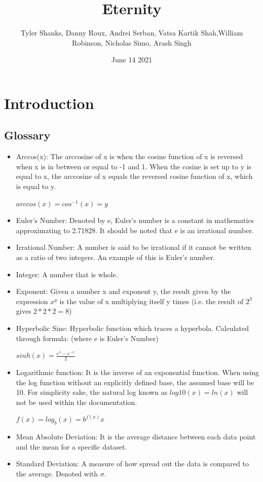 \documentclass[titlepage]{article}
\title{Eternity}
\author{Tyler Shanks, Danny Roux, Andrei Serban, Vatsa Kartik Shah,\newpage William Robinson, Nicholas Simo, Arash Singh}
\date{June 14 2021}
\begin{document}



\fancyfoot{\thepage}

\tableofcontents
\newpage

\section{Introduction}
    \subsection{Glossary}
        \begin{itemize}
            \item Arccos(x): The arccosine of x is when the cosine function of x is reversed when x is in between or equal to -1 and 1. When the cosine is set up to y is equal to x, the arccosine of x equals the reversed cosine function of x, which is equal to y. \cite{arccos}
            \begin{center}
                $arccos(x) = cos^{-1}(x) = y$
            \end{center}
            \item Euler’s Number: Denoted by e, Euler’s number is a constant in mathematics approximating to 2.71828. It should be noted that e is an irrational number.\cite{boundless}
            \item Irrational Number: A number is said to be irrational if it cannot be written as a ratio of two integers. An example of this is Euler’s number. \cite{wolfram}
            \item Integer: A number that is whole. \cite{merriam}
            \item Exponent: Given a number x and exponent y, the result given by the expression $x^y$ is the value of x multiplying itself y times (i.e. the result of $2^3$ gives $2 * 2 * 2 = 8$)
            \item Hyperbolic Sine: Hyperbolic function which traces a hyperbola. Calculated through formula: (where e is Euler’s Number) \cite{encyclopaedia}
            \begin{center}
                $sinh(x) =  \frac{e^x - e^{-x}} {2}$ 
            \end{center}
            \item Logarithmic function: It is the inverse of an exponential function. When using the log function without an explicitly defined base, the assumed base will be 10. For simplicity sake, the natural log known as $log10(x) = ln(x)$ will not be used within the documentation.\cite{dawkins}
            \begin{center}
                $f(x) = log_b(x) = b^{f(x)}x$ 
            \end{center}
            \item  Mean Absolute Deviation: It is the average distance between each data point and the mean for a specific dataset. \cite{khan}
            \item Standard Deviation: A measure of how spread out the data is compared to the average. Denoted with $\sigma$. \cite{students}
        \end{itemize}
        
\end{document}
